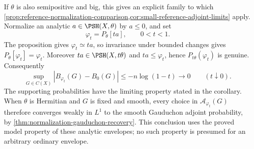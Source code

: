 If $\theta$ is also semipositive and big, this gives an explicit family to which \cref{prop:reference-normalization-comparison,cor:small-reference-adjoint-limits} apply. Normalize an analytic $a\in\PSH(X,\theta)$ by $a\leq0$, and set
\[
 \varphi_t=P_\theta[ta],\qquad 0<t<1.
\]
The proposition gives $\varphi_t\simeq ta$, so invariance under bounded changes gives $P_\theta[\varphi_t]=\varphi_t$. Moreover $ta\in\PSH(X,t\theta)$ and $ta\leq\varphi_t$, hence $P_{t\theta}(\varphi_t)$ is genuine. Consequently
\[
 \sup_{G\in C(X)}|B_{\varphi_t}(G)-B_0(G)|
       \leq-n\log(1-t)\longrightarrow0
       \qquad(t\downarrow0).
\]
The supporting probabilities have the limiting property stated in the corollary. When $\theta$ is Hermitian and $G$ is fixed and smooth, every choice in $\mathcal A_{\varphi_t}(G)$ therefore converges weakly in $L^1$ to the smooth Gauduchon adjoint probability, by \cref{thm:normalization-gauduchon-recovery}. This conclusion uses the proved model property of these analytic envelopes; no such property is presumed for an arbitrary ordinary envelope.
